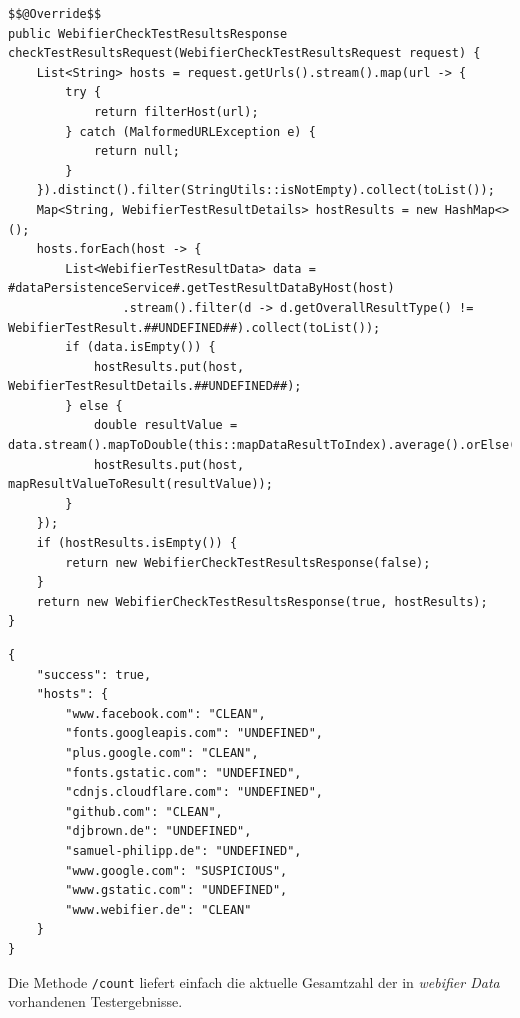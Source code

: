 \begin{scriptsize}
\begin{lstlisting}
$$@Override$$
public WebifierCheckTestResultsResponse checkTestResultsRequest(WebifierCheckTestResultsRequest request) {
    List<String> hosts = request.getUrls().stream().map(url -> {
        try {
            return filterHost(url);
        } catch (MalformedURLException e) {
            return null;
        }
    }).distinct().filter(StringUtils::isNotEmpty).collect(toList());
    Map<String, WebifierTestResultDetails> hostResults = new HashMap<>();
    hosts.forEach(host -> {
        List<WebifierTestResultData> data = #dataPersistenceService#.getTestResultDataByHost(host)
                .stream().filter(d -> d.getOverallResultType() != WebifierTestResult.##UNDEFINED##).collect(toList());
        if (data.isEmpty()) {
            hostResults.put(host, WebifierTestResultDetails.##UNDEFINED##);
        } else {
            double resultValue = data.stream().mapToDouble(this::mapDataResultToIndex).average().orElse(1);
            hostResults.put(host, mapResultValueToResult(resultValue));
        }
    });
    if (hostResults.isEmpty()) {
        return new WebifierCheckTestResultsResponse(false);
    }
    return new WebifierCheckTestResultsResponse(true, hostResults);
}
\end{lstlisting}
\end{scriptsize}

\begin{scriptsize}
\begin{lstlisting}
{
    "success": true,
    "hosts": {
        "www.facebook.com": "CLEAN",
        "fonts.googleapis.com": "UNDEFINED",
        "plus.google.com": "CLEAN",
        "fonts.gstatic.com": "UNDEFINED",
        "cdnjs.cloudflare.com": "UNDEFINED",
        "github.com": "CLEAN",
        "djbrown.de": "UNDEFINED",
        "samuel-philipp.de": "UNDEFINED",
        "www.google.com": "SUSPICIOUS",
        "www.gstatic.com": "UNDEFINED",
        "www.webifier.de": "CLEAN"
    }
}
\end{lstlisting}
\end{scriptsize}

Die Methode \lstinline[style=eclipse]{/count} liefert einfach die aktuelle Gesamtzahl der in
\textit{webifier Data} vorhandenen Testergebnisse.

